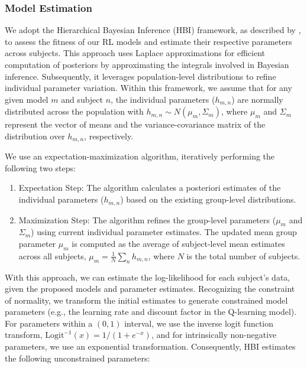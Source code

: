 \documentclass[
  number,
  preprint,
  3p,
  onecolumn]{elsarticle}
\providecommand{\tightlist}{%
  \setlength{\itemsep}{0pt}\setlength{\parskip}{0pt}}
\begin{document}
\subsubsection{Model Estimation}\label{model-estimation}

We adopt the Hierarchical Bayesian Inference (HBI) framework, as
described by \citep{piray2019a}, to assess the fitness of our RL models
and estimate their respective parameters across subjects. This approach
uses Laplace approximations for efficient computation of posteriors by
approximating the integrals involved in Bayesian inference.
Subsequently, it leverages population-level distributions to refine
individual parameter variation. Within this framework, we assume that
for any given model \(m\) and subject \(n\), the individual parameters
(\(h_{m,n}\)) are normally distributed across the population with
\(h_{m,n} \sim N(\mu_m, \Sigma_m)\), where \(\mu_m\) and \(\Sigma_m\)
represent the vector of means and the variance-covariance matrix of the
distribution over \(h_{m,n}\), respectively.

We use an expectation-maximization algorithm, iteratively performing the
following two steps:

\begin{enumerate}
\def\labelenumi{\arabic{enumi}.}
\tightlist
\item
  Expectation Step: The algorithm calculates a posteriori estimates of
  the individual parameters (\(h_{m,n}\)) based on the existing
  group-level distributions.
\item
  Maximization Step: The algorithm refines the group-level parameters
  (\(\mu_m\) and \(\Sigma_m\)) using current individual parameter
  estimates. The updated mean group parameter \(\mu_m\) is computed as
  the average of subject-level mean estimates across all subjects,
  \(\mu_m = \frac{1}{N}\sum_{n}h_{m,n}\), where \(N\) is the total
  number of subjects.
\end{enumerate}

With this approach, we can estimate the log-likelihood for each
subject's data, given the proposed models and parameter estimates.
Recognizing the constraint of normality, we transform the initial
estimates to generate constrained model parameters (e.g., the learning
rate and discount factor in the Q-learning model). For parameters within
a \((0,1)\) interval, we use the inverse logit function transform,
\(\text{Logit}^{-1}(x)=1/(1+e^{-x})\), and for intrinsically
non-negative parameters, we use an exponential transformation.
Consequently, HBI estimates the following unconstrained parameters:
\end{document}
